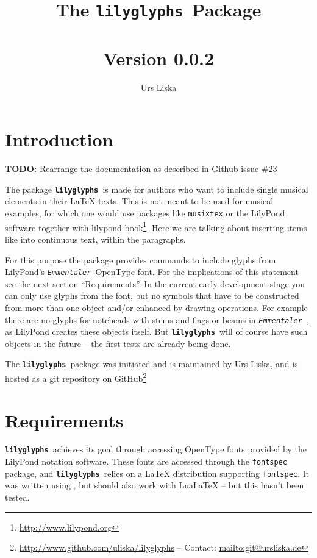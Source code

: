 \documentclass{article}
\newcommand*{\lilyglyphs}{\texttt{\textbf{lilyglyphs\,}}}
\newcommand*{\emmentaler}{\texttt{\textit{Emmentaler }}}
\begin{document}
\title{The \lilyglyphs Package\\~\\
	\normalsize Version 0.0.2}
\author{Urs Liska}

\maketitle
\tableofcontents

\pagebreak
\section{Introduction}
\label{sec:introduction}
{\color{red} \textbf{TODO:} Rearrange the documentation as described in Github issue \#23}

The package \lilyglyphs is made for authors who want to include single musical elements in their \LaTeX{} texts. 
This is not meant to be used for musical examples, for which one would use packages like \texttt{musixtex} or the LilyPond software together with lilypond-book\footnote{\url{http://www.lilypond.org}}. 
Here we are talking about inserting items like \lilyRFZ into continuous text, within the paragraphs.

For this purpose the package provides commands to include glyphs from LilyPond's \emmentaler OpenType font. 
For the implications of this statement see the next section \enquote{Requirements}. 
In the current early development stage you can only use glyphs from the font, but no symbols that have to be constructed from more than one object and/or enhanced by drawing operations. 
For example there are no glyphs for noteheads with stems and flags or beams in \emmentaler, as LilyPond creates these objects itself. 
But \lilyglyphs will of course have such objects in the future -- the first tests are already being done.

The \lilyglyphs package was initiated and is maintained by Urs Liska, and is hosted as a git repository on GitHub\footnote{\url{http://www.github.com/uliska/lilyglyphs} -- Contact: \url{mailto:git@ursliska.de}}

\section{Requirements}
\label{sec:requirements}
\lilyglyphs achieves its goal through accessing OpenType fonts provided by the LilyPond notation software. 
These fonts are accessed through the \texttt{fontspec} package, and \lilyglyphs relies on a \LaTeX{} distribution supporting \texttt{fontspec}. 
It was written using \XeLaTeX, but should also work with LuaLaTeX -- but this hasn't been tested.
\end{document}
